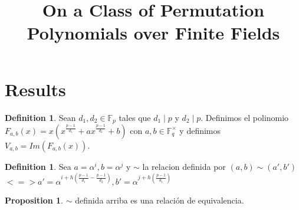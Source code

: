 \documentclass{article}
\theoremstyle{definition}
\newtheorem{definition}[theorem]{Definition}
\newtheorem{prop}[theorem]{Proposition}
\theoremstyle{remark}
\numberwithin{equation}{section}
\begin{document}
\title{On a Class of Permutation Polynomials over Finite Fields}


\maketitle

\begin{abstract}

\end{abstract}


\section{Results}

\begin{definition}
  Sean $d_1, d_2 \in \mathbb{F}_p$ tales que $d_1 \mid p$ y $d_2 \mid p$. Definimos el polinomio $F_{a,b}(x) = x(x^{\frac{p-1}{d_1}} + ax^{\frac{p-1}{d_2}} +b)$ con $a,b \in \mathbb{F}_q^{\times}$ y definimos $V_{a,b} = Im(F_{a,b}(x))$.
\end{definition}

\begin{definition}

  Sea $a = \alpha^i, b = \alpha^j$ y $\sim$ la relacion definida por $(a,b) \sim (a', b')$ 
  $<=> a' = \alpha^{i+h(\frac{p-1}{d_1} - \frac{p-1}{d_2})}, b' = \alpha^{j+h(\frac{p-1}{d_1})}$

\end{definition}

\begin{prop}
  
  $\sim$ definida arriba es una relaci\'on de equivalencia.

\end{prop}
\end{document}
